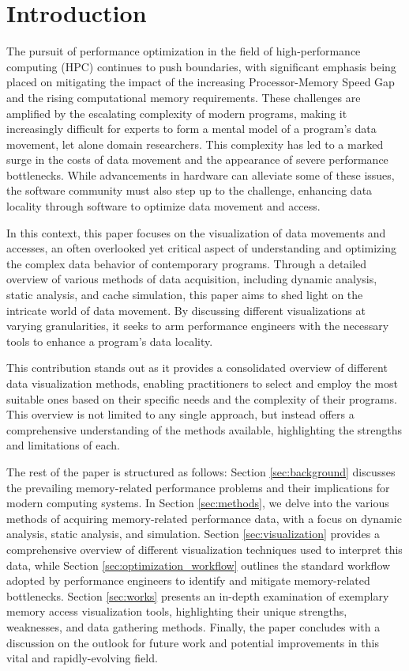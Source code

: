 \section{Introduction}\label{sec:introduction}
The pursuit of performance optimization in the field of high-performance computing (HPC) continues to push boundaries, with significant emphasis being placed on mitigating the impact of the increasing Processor-Memory Speed Gap and the rising computational memory requirements. These challenges are amplified by the escalating complexity of modern programs, making it increasingly difficult for experts to form a mental model of a program's data movement, let alone domain researchers. This complexity has led to a marked surge in the costs of data movement and the appearance of severe performance bottlenecks. While advancements in hardware can alleviate some of these issues, the software community must also step up to the challenge, enhancing data locality through software to optimize data movement and access.

In this context, this paper focuses on the visualization of data movements and accesses, an often overlooked yet critical aspect of understanding and optimizing the complex data behavior of contemporary programs. Through a detailed overview of various methods of data acquisition, including dynamic analysis, static analysis, and cache simulation, this paper aims to shed light on the intricate world of data movement. By discussing different visualizations at varying granularities, it seeks to arm performance engineers with the necessary tools to enhance a program's data locality.

This contribution stands out as it provides a consolidated overview of different data visualization methods, enabling practitioners to select and employ the most suitable ones based on their specific needs and the complexity of their programs. This overview is not limited to any single approach, but instead offers a comprehensive understanding of the methods available, highlighting the strengths and limitations of each.

The rest of the paper is structured as follows: Section \ref{sec:background} discusses the prevailing memory-related performance problems and their implications for modern computing systems. In Section \ref{sec:methods}, we delve into the various methods of acquiring memory-related performance data, with a focus on dynamic analysis, static analysis, and simulation. Section \ref{sec:visualization} provides a comprehensive overview of different visualization techniques used to interpret this data, while Section \ref{sec:optimization_workflow} outlines the standard workflow adopted by performance engineers to identify and mitigate memory-related bottlenecks. Section \ref{sec:works} presents an in-depth examination of exemplary memory access visualization tools, highlighting their unique strengths, weaknesses, and data gathering methods. Finally, the paper concludes with a discussion on the outlook for future work and potential improvements in this vital and rapidly-evolving field.
